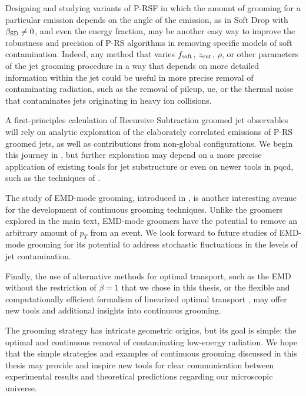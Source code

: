 Designing and studying variants of P-RSF in which the amount of grooming for a particular emission depends on the angle of the emission, as in Soft Drop with \(\beta_{\rm SD} \neq 0\), and even the energy fraction, may be another easy way to improve the robustness and precision of P-RS algorithms in removing specific models of soft contamination.
%
Indeed, any method that varies \(f_{\rm soft}\), \(z_{\rm cut}\), \(\rho\), or other parameters of the jet grooming procedure in a way that depends on more detailed information within the jet could be useful in more precise removal of contaminating radiation, such as the removal of \gls{pileup}, \gls{ue}, or the thermal noise that contaminates jets originating in heavy ion collisions.

   A first-principles calculation of Recursive Subtraction groomed jet observables will rely on analytic exploration of the elaborately correlated emissions of P-RS groomed jets, as well as contributions from non-global configurations.
%
We begin this journey in , but further exploration may depend on a more precise application of existing tools for jet substructure or even on newer tools in \gls{pqcd}, such as the techniques of .

The study of EMD-mode \PIRANHA{} grooming, introduced in , is another interesting avenue for the development of continuous grooming techniques.
%
Unlike the \PIRANHA{} groomers explored in the main text, EMD-mode \PIRANHA{} groomers have the potential to remove an arbitrary amount of \(p_T\) from an event.
%
We look forward to future studies of EMD-mode grooming for its potential to address stochastic fluctuations in the levels of jet contamination.

Finally, the use of alternative methods for optimal transport, such as the EMD without the restriction of \(\beta = 1\) that we chose in this thesis, or the flexible and computationally efficient formalism of linearized optimal transport \cite{Cai:2020vzx,Cai:2021hnn,cai2022linearized,sarrazin2023linearized}, may offer new tools and additional insights into continuous grooming.

The \PIRANHA{} grooming strategy has intricate geometric origins, but its goal is simple: the optimal and continuous removal of contaminating low-energy radiation.
%
We hope that the simple strategies and examples of continuous grooming discussed in this thesis may provide and inspire new tools for clear communication between experimental results and theoretical predictions regarding our microscopic universe.


